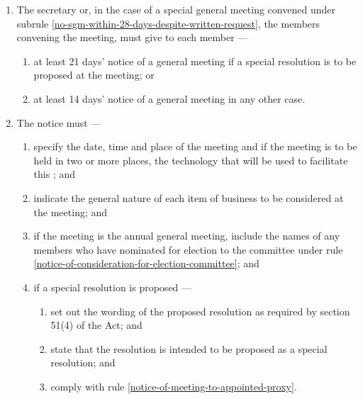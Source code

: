 \documentclass[../constitution.tex]{subfiles}
\begin{document}
\begin{enumerate}

  \item The secretary or, in the case of a special general meeting convened under subrule \ref{no-sgm-within-28-days-despite-written-request}, the members convening the meeting, must give to each member ---

        \begin{enumerate}

          \item at least 21 days' notice of a general meeting if a special resolution is to be proposed at the meeting; or
          \item at least 14 days' notice of a general meeting in any other case.
        \end{enumerate}
  \item The notice must ---

        \begin{enumerate}

          \item specify the date, time and place of the meeting and if the meeting is to be held in two or more places, the technology that will be used to facilitate this ; and
          \item indicate the general nature of each item of business to be considered at the meeting; and
          \item if the meeting is the annual general meeting, include the names of any members who have nominated for election to the committee under rule \ref{notice-of-consideration-for-election-committee}; and
          \item if a special resolution is proposed ---

                \begin{enumerate}

                  \item set out the wording of the proposed resolution as required by section 51(4) of the Act; and
                  \item state that the resolution is intended to be proposed as a special resolution; and
                  \item comply with rule \ref{notice-of-meeting-to-appointed-proxy}.
                \end{enumerate}
        \end{enumerate}


\end{enumerate}
\end{document}
